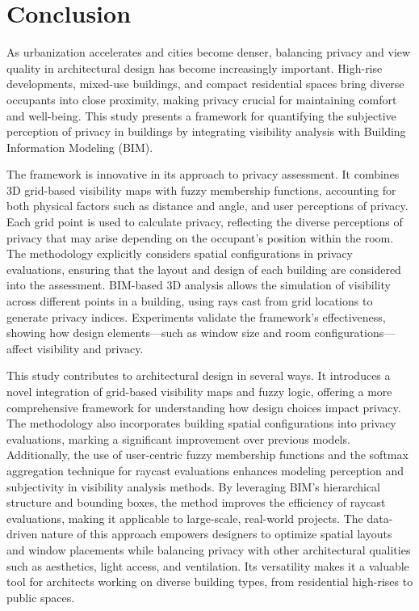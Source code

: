 \documentclass[final,3p,times,review]{elsarticle}
\begin{document}
\section*{Conclusion}

As urbanization accelerates and cities become denser, balancing privacy and view quality in architectural design has become increasingly important. High-rise developments, mixed-use buildings, and compact residential spaces bring diverse occupants into close proximity, making privacy crucial for maintaining comfort and well-being. This study presents a framework for quantifying the subjective perception of privacy in buildings by integrating visibility analysis with Building Information Modeling (BIM).

The framework is innovative in its approach to privacy assessment. It combines 3D grid-based visibility maps with fuzzy membership functions, accounting for both physical factors such as distance and angle, and user perceptions of privacy.  Each grid point is used to calculate privacy, reflecting the diverse perceptions of privacy that may arise depending on the occupant’s position within the room. The methodology explicitly considers spatial configurations in privacy evaluations, ensuring that the layout and design of each building are considered into the assessment. BIM-based 3D analysis allows the simulation of visibility across different points in a building, using rays cast from grid locations to generate privacy indices. Experiments validate the framework's effectiveness, showing how design elements—such as window size and room configurations—affect visibility and privacy. 

This study contributes to architectural design in several ways. It introduces a novel integration of grid-based visibility maps and fuzzy logic, offering a more comprehensive framework for understanding how design choices impact privacy. The methodology also incorporates building spatial configurations into privacy evaluations, marking a significant improvement over previous models. Additionally, the use of user-centric fuzzy membership functions and the softmax aggregation technique for raycast evaluations enhances modeling perception and subjectivity in visibility analysis methods. By leveraging BIM’s hierarchical structure and bounding boxes, the method improves the efficiency of raycast evaluations, making it applicable to large-scale, real-world projects. The data-driven nature of this approach empowers designers to optimize spatial layouts and window placements while balancing privacy with other architectural qualities such as aesthetics, light access, and ventilation. Its versatility makes it a valuable tool for architects working on diverse building types, from residential high-rises to public spaces.
\end{document}
